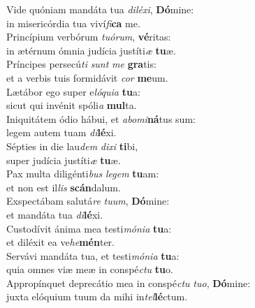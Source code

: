 \oddverse Vide quóniam mandáta tua \textit{di}\textit{lé}\textit{xi}, \textbf{Dó}mine:~\*\\
\oddverse in misericórdia tua viví\textit{fi}\textbf{ca} me.\\
\evenverse Princípium verbórum \textit{tu}\textit{ó}\textit{rum}, \textbf{vé}ritas:~\*\\
\evenverse in ætérnum ómnia judícia justíti\textit{æ} \textbf{tu}æ.\\
\oddverse Príncipes persecú\textit{ti} \textit{sunt} \textit{me} \textbf{gra}tis:~\*\\
\oddverse et a verbis tuis formidávit \textit{cor} \textbf{me}um.\\
\evenverse Lætábor ego super e\textit{ló}\textit{qui}\textit{a} \textbf{tu}a:~\*\\
\evenverse sicut qui invénit spóli\textit{a} \textbf{mul}ta.\\
\oddverse Iniquitátem ódio hábui, et \textit{a}\textit{bo}\textit{mi}\textbf{ná}tus sum:~\*\\
\oddverse legem autem tuam \textit{di}\textbf{lé}xi.\\
\evenverse Sépties in die lau\textit{dem} \textit{di}\textit{xi} \textbf{ti}bi,~\*\\
\evenverse super judícia justíti\textit{æ} \textbf{tu}æ.\\
\oddverse Pax multa diligénti\textit{bus} \textit{le}\textit{gem} \textbf{tu}am:~\*\\
\oddverse et non est il\textit{lis} \textbf{scán}dalum.\\
\evenverse Exspectábam salutá\textit{re} \textit{tu}\textit{um}, \textbf{Dó}mine:~\*\\
\evenverse et mandáta tua \textit{di}\textbf{lé}xi.\\
\oddverse Custodívit ánima mea testi\textit{mó}\textit{ni}\textit{a} \textbf{tu}a:~\*\\
\oddverse et diléxit ea ve\textit{he}\textbf{mén}ter.\\
\evenverse Servávi mandáta tua, et testi\textit{mó}\textit{ni}\textit{a} \textbf{tu}a:~\*\\
\evenverse quia omnes viæ meæ in conspé\textit{ctu} \textbf{tu}o.\\
\oddverse Appropínquet deprecátio mea in conspé\textit{ctu} \textit{tu}\textit{o}, \textbf{Dó}mine:~\*\\
\oddverse juxta elóquium tuum da mihi in\textit{tel}\textbf{lé}ctum.\\
